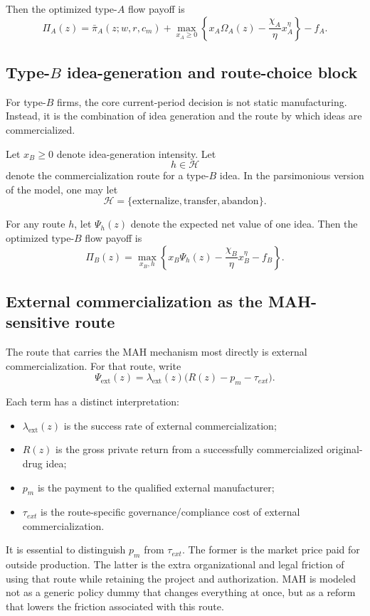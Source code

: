 \documentclass[12pt]{ctexart}
\begin{document}
Then the optimized type-$A$ flow payoff is
\[
\Pi_A(z)
=
\bar{\pi}_A(z;w,r,c_m)
+
\max_{x_A\ge 0}
\left\{
x_A\Omega_A(z)-\frac{\chi_A}{\eta}x_A^\eta
\right\}
-f_A.
\]

\subsection{Type-$B$ idea-generation and route-choice block}

For type-$B$ firms, the core current-period decision is not static manufacturing.
Instead, it is the combination of idea generation and the route by which ideas
are commercialized.

Let $x_B\ge 0$ denote idea-generation intensity. Let
\[
h\in\mathcal{H}
\]
denote the commercialization route for a type-$B$ idea. In the parsimonious
version of the model, one may let
\[
\mathcal{H}=\{\text{externalize},\text{transfer},\text{abandon}\}.
\]

For any route $h$, let $\Psi_h(z)$ denote the expected net value of one idea.
Then the optimized type-$B$ flow payoff is
\[
\Pi_B(z)
=
\max_{x_B,h}
\left\{
x_B\Psi_h(z)-\frac{\chi_B}{\eta}x_B^\eta-f_B
\right\}.
\]

\subsection{External commercialization as the MAH-sensitive route}

The route that carries the MAH mechanism most directly is external commercialization.
For that route, write
\[
\Psi_{\mathrm{ext}}(z)
=
\lambda_{\mathrm{ext}}(z)\bigl(R(z)-p_m-\tau_{ext}\bigr).
\]

Each term has a distinct interpretation:

\begin{itemize}[leftmargin=2em]
    \item $\lambda_{\mathrm{ext}}(z)$ is the success rate of external commercialization;
    \item $R(z)$ is the gross private return from a successfully commercialized original-drug idea;
    \item $p_m$ is the payment to the qualified external manufacturer;
    \item $\tau_{ext}$ is the route-specific governance/compliance cost of external commercialization.
\end{itemize}

It is essential to distinguish $p_m$ from $\tau_{ext}$. The former is the market price
paid for outside production. The latter is the extra organizational and legal friction of
using that route while retaining the project and authorization. MAH is modeled not as
a generic policy dummy that changes everything at once, but as a reform that lowers
the friction associated with this route.
\end{document}
